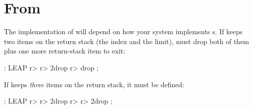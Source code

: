 \section{From }

The implementation of  will depend on how your
system implements  s.  If  keeps two
items on the return stack (the index and the limit),  must
drop both of them plus one more return-stack item to exit:
\begin{Code}
: LEAP   r> r> 2drop  r> drop ;
\end{Code}
If  keeps \emph{three} items on the return stack, it must be
defined:
\begin{Code}
: LEAP   r> r> 2drop  r> r> 2drop ;
\end{Code}

